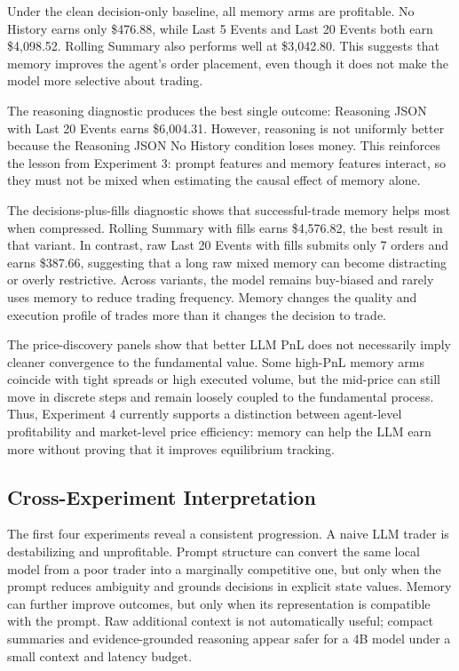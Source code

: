 \documentclass[11pt]{article}
\begin{document}
Under the clean decision-only baseline, all memory arms are profitable. No History earns only \$476.88, while Last 5 Events and Last 20 Events both earn \$4,098.52. Rolling Summary also performs well at \$3,042.80. This suggests that memory improves the agent's order placement, even though it does not make the model more selective about trading.

The reasoning diagnostic produces the best single outcome: Reasoning JSON with Last 20 Events earns \$6,004.31. However, reasoning is not uniformly better because the Reasoning JSON No History condition loses money. This reinforces the lesson from Experiment 3: prompt features and memory features interact, so they must not be mixed when estimating the causal effect of memory alone.

The decisions-plus-fills diagnostic shows that successful-trade memory helps most when compressed. Rolling Summary with fills earns \$4,576.82, the best result in that variant. In contrast, raw Last 20 Events with fills submits only 7 orders and earns \$387.66, suggesting that a long raw mixed memory can become distracting or overly restrictive. Across variants, the model remains buy-biased and rarely uses memory to reduce trading frequency. Memory changes the quality and execution profile of trades more than it changes the decision to trade.

The price-discovery panels show that better LLM PnL does not necessarily imply cleaner convergence to the fundamental value. Some high-PnL memory arms coincide with tight spreads or high executed volume, but the mid-price can still move in discrete steps and remain loosely coupled to the fundamental process. Thus, Experiment 4 currently supports a distinction between agent-level profitability and market-level price efficiency: memory can help the LLM earn more without proving that it improves equilibrium tracking.

\subsection{Cross-Experiment Interpretation}

The first four experiments reveal a consistent progression. A naive LLM trader is destabilizing and unprofitable. Prompt structure can convert the same local model from a poor trader into a marginally competitive one, but only when the prompt reduces ambiguity and grounds decisions in explicit state values. Memory can further improve outcomes, but only when its representation is compatible with the prompt. Raw additional context is not automatically useful; compact summaries and evidence-grounded reasoning appear safer for a 4B model under a small context and latency budget.
\end{document}
